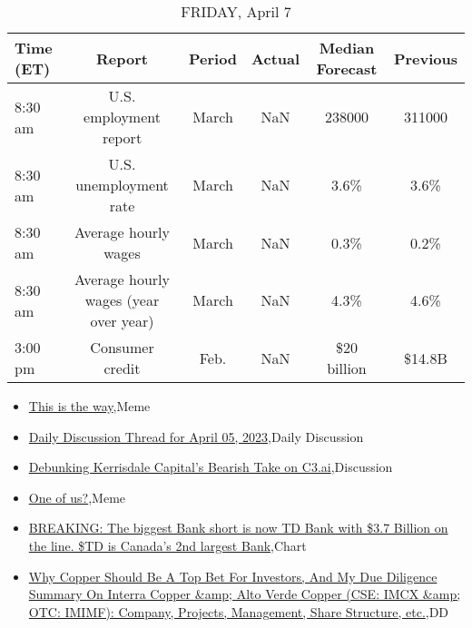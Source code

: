 \documentclass{article}%
\begin{document}
\begin{table}[htbp]%
\caption{FRIDAY, April 7}%
\centering%
\begin{adjustbox}{width=1\textwidth}%
\begin{tabular}{lccccc}
\toprule
Time (ET) &                                Report & Period & Actual & Median Forecast & Previous \\
\midrule
  8:30 am &                U.S. employment report &  March &    NaN &          238000 &   311000 \\
  8:30 am &                U.S. unemployment rate &  March &    NaN &            3.6\% &     3.6\% \\
  8:30 am &                  Average hourly wages &  March &    NaN &            0.3\% &     0.2\% \\
  8:30 am & Average hourly wages (year over year) &  March &    NaN &            4.3\% &     4.6\% \\
  3:00 pm &                       Consumer credit &   Feb. &    NaN &     \$20 billion &   \$14.8B \\
\bottomrule
\end{tabular}
%
\end{adjustbox}%
\end{table}

%
\begin{itemize}%
\item%
\href{https://reddit.com/r/wallstreetbets/comments/12cgybc/this\_is\_the\_way/}{This is the way},Meme%
\item%
\href{https://reddit.com/r/wallstreetbets/comments/12cf3to/daily\_discussion\_thread\_for\_april\_05\_2023/}{Daily Discussion Thread for April 05, 2023},Daily Discussion%
\item%
\href{https://reddit.com/r/wallstreetbets/comments/12cecmm/debunking\_kerrisdale\_capitals\_bearish\_take\_on\_c3ai/}{Debunking Kerrisdale Capital's Bearish Take on C3.ai},Discussion%
\item%
\href{https://reddit.com/r/wallstreetbets/comments/12capok/one\_of\_us/}{One of us?},Meme%
\item%
\href{https://reddit.com/r/wallstreetbets/comments/12c7u3x/breaking\_the\_biggest\_bank\_short\_is\_now\_td\_bank/}{BREAKING: The biggest Bank short is now TD Bank with \$3.7 Billion on the line. \$TD is Canada's 2nd largest Bank},Chart%
\item%
\href{https://reddit.com/r/Baystreetbets/comments/12byh9n/why\_copper\_should\_be\_a\_top\_bet\_for\_investors\_and/}{Why Copper Should Be A Top Bet For Investors, And My Due Diligence Summary On Interra Copper \&amp; Alto Verde Copper (CSE: IMCX \&amp; OTC: IMIMF): Company, Projects, Management, Share Structure, etc.},DD%
\end{itemize}%
\end{document}
